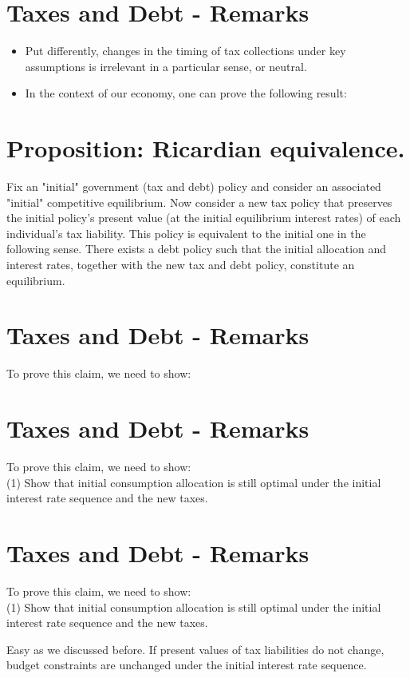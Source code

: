 \documentclass[10pt]{article}
\begin{document}
\section*{Taxes and Debt - Remarks}
\begin{itemize}
  \item Put differently, changes in the timing of tax collections under key assumptions is irrelevant in a particular sense, or neutral.
  \item In the context of our economy, one can prove the following result:
\end{itemize}

\section*{Proposition: Ricardian equivalence.}
Fix an "initial" government (tax and debt) policy and consider an associated "initial" competitive equilibrium. Now consider a new tax policy that preserves the initial policy's present value (at the initial equilibrium interest rates) of each individual's tax liability. This policy is equivalent to the initial one in the following sense. There exists a debt policy such that the initial allocation and interest rates, together with the new tax and debt policy, constitute an equilibrium.

\section*{Taxes and Debt - Remarks}
To prove this claim, we need to show:

\section*{Taxes and Debt - Remarks}
To prove this claim, we need to show:\\
(1) Show that initial consumption allocation is still optimal under the initial interest rate sequence and the new taxes.

\section*{Taxes and Debt - Remarks}
To prove this claim, we need to show:\\
(1) Show that initial consumption allocation is still optimal under the initial interest rate sequence and the new taxes.

Easy as we discussed before. If present values of tax liabilities do not change, budget constraints are unchanged under the initial interest rate sequence.
\end{document}
